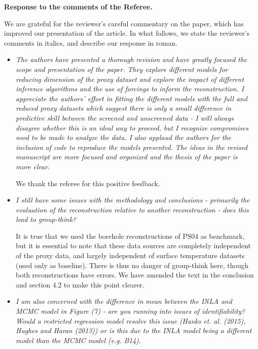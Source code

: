 \documentclass[11pt]{article}
\begin{document}
\begin{center}
  {\Large \textbf{Response to the comments of the Referee.}}
\end{center}

We are grateful for the reviewer's careful commentary on the paper, which has improved
our presentation of the article. In what follows, we state the reviewer's
comments in italics, and describe our response in roman.

\begin{itemize}
  
\item \textit{The authors have presented a thorough revision and have greatly
    focused the scope and presentation of the paper. They explore different
    models for reducing dimension of the proxy dataset and explore the impact of
    different inference algorithms and the use of forcings to inform the
    reconstruction. I appreciate the authors’ effort in fitting the different
    models with the full and reduced proxy datasets which suggest there is only
    a small difference in predictive skill between the screened and unscreened
    data - I will always disagree whether this is an ideal way to proceed, but I
    recognize compromises need to be made to analyze the data. I also applaud
    the authors for the inclusion of code to reproduce the models presented. The
    ideas in the revised manuscript are more focused and organized and the thesis of the paper is more clear.
}

We thank the referee for this positive feedback. 
\item \textit{I still have some issues with the methodology and conclusions -
    primarily the evaluation of the reconstruction relative to another
    reconstruction - does this lead to group-think?}

It is true that we used the borehole reconstructions of PS04 as benchmark, but it is essential to note that these data sources are completely independent of the proxy data, and largely independent of surface temperature datasets (used only as baseline). There is thus no danger of group-think here, though both reconstructions have errors. We have amended the text in the conclusion and section 4.2 to make this point clearer.


  
\item \textit{I am also concerned with the
    difference in mean between the INLA and MCMC model in Figure (7) - are you
    running into issues of identifiability? Would a restricted regression model
    resolve this issue (Hanks et. al. (2015), Hughes and Haran (2013)) or is
    this due to the INLA model being a different model than the MCMC model (e.g.
    B14).}


\end{itemize}
\end{document}
